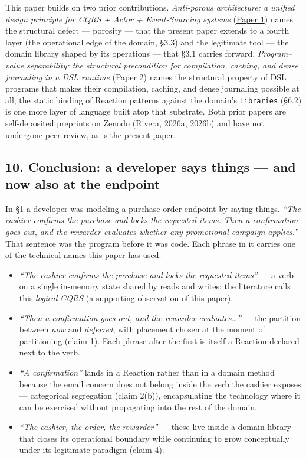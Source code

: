 \documentclass[
]{article}
\providecommand{\tightlist}{%
  \setlength{\itemsep}{0pt}\setlength{\parskip}{0pt}}
\let\origtexttt\texttt%
\renewcommand{\texttt}[1]{\origtexttt{\seqsplit{#1}}}%
\let\texttt\origtexttt%
\begin{document}
This paper builds on two prior contributions. \emph{Anti-porous
architecture: a unified design principle for CQRS + Actor +
Event-Sourcing systems} (\href{01-anti-porosity.md}{Paper 1}) names the
structural defect --- porosity --- that the present paper extends to a
fourth layer (the operational edge of the domain, §3.3) and the
legitimate tool --- the domain library shaped by its operations --- that
§3.1 carries forward. \emph{Program--value separability: the structural
precondition for compilation, caching, and dense journaling in a DSL
runtime} (\href{02-program-value-separability.md}{Paper 2}) names the
structural property of DSL programs that makes their compilation,
caching, and dense journaling possible at all; the static binding of
Reaction patterns against the domain's \texttt{Libraries} (§6.2) is one
more layer of language built atop that substrate. Both prior papers are
self-deposited preprints on Zenodo (Rivera, 2026a, 2026b) and have not
undergone peer review, as is the present paper.

\subsection{10. Conclusion: a developer says things --- and now also at
the
endpoint}\label{conclusion-a-developer-says-things-and-now-also-at-the-endpoint}

In §1 a developer was modeling a purchase-order endpoint by saying
things. \emph{``The cashier confirms the purchase and locks the
requested items. Then a confirmation goes out, and the rewarder
evaluates whether any promotional campaign applies.''} That sentence was
the program before it was code. Each phrase in it carries one of the
technical names this paper has used.

\begin{itemize}
\tightlist
\item
  \emph{``The cashier confirms the purchase and locks the requested
  items''} --- a verb on a single in-memory state shared by reads and
  writes; the literature calls this \emph{logical CQRS} (a supporting
  observation of this paper).
\item
  \emph{``Then a confirmation goes out, and the rewarder
  evaluates\ldots{}''} --- the partition between \emph{now} and
  \emph{deferred}, with placement chosen at the moment of partitioning
  (claim 1). Each phrase after the first is itself a Reaction declared
  next to the verb.
\item
  \emph{``A confirmation''} lands in a Reaction rather than in a domain
  method because the email concern does not belong inside the verb the
  cashier exposes --- categorical segregation (claim 2(b)),
  encapsulating the technology where it can be exercised without
  propagating into the rest of the domain.
\item
  \emph{``The cashier, the order, the rewarder''} --- these live inside
  a domain library that closes its operational boundary while continuing
  to grow conceptually under its legitimate paradigm (claim 4).
\end{itemize}
\end{document}
